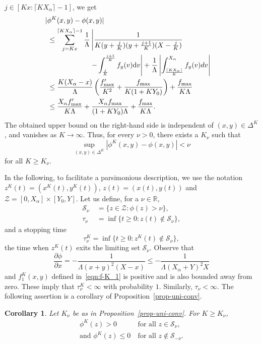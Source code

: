 \documentclass[10pt,journal,letterpaper]{IEEEtran}
\newtheorem{corollary}{Corollary}[section]
\begin{document}
\begin{IEEEproof}
$j \in [Kx:\lceil KX_{\alpha} \rceil -1]$, we get
\begin{align*}
\lefteqn{|\phi^K(x,y) - \phi(x,y)|} \\
&~\leq \sum_{j = Kx}^{\lceil KX_{\alpha} \rceil -1}
\frac{1}{\Lambda}\left| \frac{1}{K(y + \frac{j}{K})(y +
\frac{j+1}{K})(X
-\frac{j}{K})}\right. \\
&~ \ \ \ \ \ \ \ \ \ \ \ \ \ \ \ \ \ \ \left. - \int_{\frac{j}{K}}^{\frac{j+1}{K}}f_y(v){\rm d}v \right| + \frac{1}{\Lambda}\left| \int_{\frac{\lceil KX_{\alpha} \rceil}{K}}^{X_{\alpha}}f_y(v)dv \right| \\
&~\leq \frac{K(X_{\alpha}-x)}{\Lambda}\left(\frac{f'_{\max}}{K^2} + \frac{f_{\max}}{K(1 + KY_0)}\right) + \frac{f_{\max}}{K \Lambda} \\
&~\leq \frac{X_{\alpha}f'_{\max}}{K\Lambda} +
\frac{X_{\alpha}f_{\max}}{(1 + K Y_0)\Lambda} +
\frac{f_{\max}}{K\Lambda}.
\end{align*}
The obtained upper bound on the right-hand side is independent of
$(x,y) \in \Delta^K$, and vanishes as $K
\rightarrow \infty$. Thus, for every $\nu > 0$, there exists a
$K_{\nu}$ such that
\begin{equation*}
\sup_{(x,y) \in \Delta^K}|\phi^K(x,y) - \phi(x,y)| < \nu
\end{equation*}
for all $K \geq K_{\nu}$.
\end{IEEEproof}

In the following, to facilitate a parsimonious description, we use
the notation $z^K(t) = (x^K(t),y^K(t))$, $z(t) = (x(t),y(t))$ and
$\mathcal{Z} = [0, X_{\alpha}] \times [Y_0, Y]$. Let us define, for
a $\nu \in \mathbb{R}$,
\begin{align*}
\mathcal{S}_{\nu} &~= \{z \in  \mathcal{Z}: \phi(z) > \nu \}, \\
\tau_{\nu} &~= \inf\{t \geq 0:z(t) \notin \mathcal{S}_{\nu}\},
\end{align*}
and a stopping time
\[
\tau^K_{\nu} = \inf\{t \geq 0:z^K(t) \notin \mathcal{S}_{\nu}\},
\]
the time when $z^K(t)$ exits the limiting set $\mathcal{S}_\nu$.
Observe that
\begin{equation}
\frac{\partial \phi}{\partial x} = -\frac{1}{\Lambda(x+y)^2 (X-x)}
\leq -\frac{1}{\Lambda(X_{\alpha}+Y)^2 X} \label{eqn:rate-phi}
\end{equation}
 and $f^K_1(x,y)$ defined in~\eqref{eqn:f-K_1} is positive and is also bounded away from zero.
 These imply that $\tau^K_{\nu} < \infty$ with probability $1$.
Similarly, $\tau_{\nu} < \infty$. The following assertion is a
corollary of Proposition~\ref{prop-uni-conv}.
\begin{corollary}
\label{cor:apprx-bdry} Let $K_{\nu}$ be as in
Proposition~\ref{prop-uni-conv}. For $K \geq K_{\nu}$,
\begin{align*}
\phi^K(z) > 0 &~\mbox{for all } z \in \mathcal{S}_{\nu},\\
\mbox{and } \phi^K(z) \leq 0 &~\mbox{for all } z \notin
\mathcal{S}_{-\nu}.
\end{align*}
\end{corollary}
\end{document}
